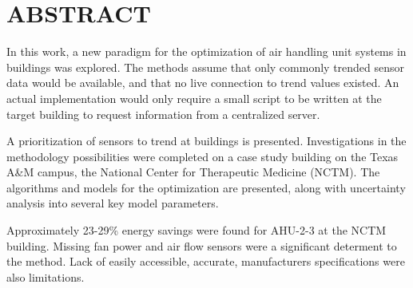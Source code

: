 %
%
%

\chapter*{ABSTRACT}

\pagestyle{plain} %
\setcounter{page}{2}

\indent  In this work, a new paradigm for the optimization of air
handling unit systems in buildings was explored. The methods assume
that only commonly trended sensor data would be available, and that no
live connection to trend values existed. An actual implementation would
only require a small script to be written at the target building to
request information from a centralized server. 

A prioritization of sensors to trend at buildings is presented.
Investigations in the methodology possibilities were completed on a case study
building on the Texas A\&M campus, the National Center for Therapeutic
Medicine (NCTM). The algorithms and models for the optimization are
presented, along with uncertainty analysis into several key model
parameters. 

Approximately 23-29\% energy savings were found for AHU-2-3 at the NCTM
building.  Missing fan power and air flow sensors were a significant determent to
the method. Lack of easily accessible, accurate, manufacturers
specifications were also limitations.  

 

\pagebreak{}

